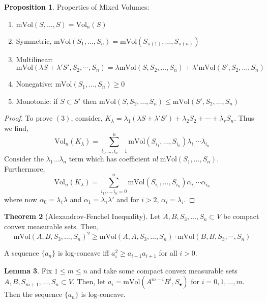 \documentclass[12pt]{extarticle}
\theoremstyle{definition}
\newtheorem{theorem}{Theorem}[section]
\newtheorem{lemma}[theorem]{Lemma}
\newtheorem{proposition}[theorem]{Proposition}
\newenvironment{definition}[1][Definition:]{\begin{trivlist}
\item[\hskip \labelsep {\bfseries #1}]}{\end{trivlist}}
\newcommand{\Vol}[2]{\mathrm{Vol}_{#1}\left( #2 \right)}
\newcommand{\mVol}[1]{\mathrm{mVol}\left( #1 \right)}
\begin{document}
\begin{proposition}
Properties of Mixed Volumes:
\begin{enumerate}
\item $\mVol{S, \dots, S} = \Vol{n}{S}$
\item Symmetric, $\mVol{S_1, \dots, S_n} = \mVol{S_{\pi(1)}, \dots, S_{\pi(n)}}$
\item Multilinear: $\mVol{\lambda S + \lambda' S', S_2, \cdots, S_n} = \lambda \mVol{S, S_2, \dots, S_n} + \lambda' \mVol{S', S_2, \dots, S_n}$
\item Nonegative: $\mVol{S_1, \dots, S_n} \ge 0$
\item Monotonic: if $S \subset S'$ then $\mVol{S, S_2, \dots, S_n} \le \mVol{S', S_2, \dots, S_n}$
\end{enumerate}
\end{proposition}

\begin{proof}
To prove $(3)$, consider, $K_\lambda = \lambda_1 (\lambda S + \lambda' S') + \lambda_2 S_2 + \cdots + \lambda_r S_n$. Thus we find,
\[ \Vol{n}{K_\lambda} = \sum_{i_1, \dots, i_n = 1}^n \mVol{S_{i_1}, \dots, S_{i_n}} \lambda_{i_1} \cdots \lambda_{i_n} \]
Consider the $\lambda_1 \dots \lambda_n$ term which has coefficient $n! \: \mVol{S_1, \dots, S_n}$. Furthermore,
\[ \Vol{n}{K_\lambda} = \sum_{i_1, \dots, i_n = 0}^{n} \mVol{S_{i_1}, \dots, S_{i_n}} \alpha_{i_1} \cdots \alpha_{i_n} \]
where now $\alpha_0 = \lambda_1 \lambda$ and $\alpha_1 = \lambda_1 \lambda'$ and for $i > 2$, $\alpha_i = \lambda_i$.  
\end{proof}

\begin{theorem}[Alexandrov-Fenchel Inequality]
Let $A, B, S_3, \dots, S_n \subset V$ be compact convex measurable sets. Then,
\[ \mVol{A, B, S_3, \dots, S_n}^2 \ge \mVol{A, A, S_3, \dots, S_n} \cdot \mVol{B, B, S_3, \cdots, S_n} \] 
\end{theorem}

\begin{definition}
A sequence $\{ a_n \}$ is log-concave iff $a_i^2 \ge a_{i - 1} a_{i+1}$ for all $i > 0$. 
\end{definition}

\begin{lemma}
Fix $1 \le m \le n$ and take some compact convex measurable sets $A, B, S_{m + 1}, \dots, S_n \subset V$. Then, let $a_i = \mVol{A^{m-i} B^i, S_\bullet}$ for $i = 0,1, \dots, m$. Then the sequence $\{ a_n \}$ is log-concave.
\end{lemma}
\end{document}
